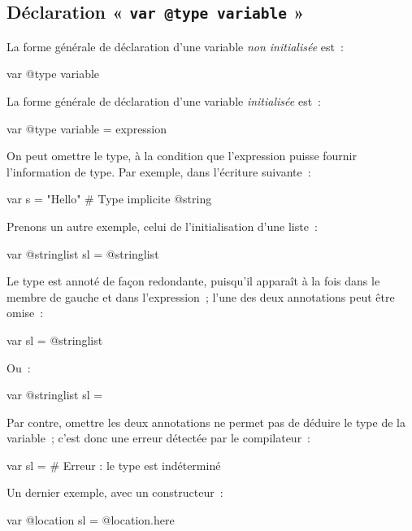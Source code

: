 \subsection{Déclaration « \texttt{var @type variable} »}

La forme générale de déclaration d'une variable \emph{non initialisée} est~:
\begin{galgasbox}
var @type variable
\end{galgasbox}





La forme générale de déclaration d'une variable \emph{initialisée} est~:
\begin{galgasbox}
var @type variable = expression
\end{galgasbox}

On peut omettre le type, à la condition que l'expression puisse fournir l'information de type. Par exemple, dans l'écriture suivante~:
\begin{galgas}
var s = "Hello" # Type implicite @string
\end{galgas}


Prenons un autre exemple, celui de l'initialisation d'une liste~:
\begin{galgas}
var @stringlist sl = @stringlist {}
\end{galgas}

Le type est annoté de façon redondante, puisqu'il apparaît à la fois dans le membre de gauche et dans l'expression~; l'une des deux annotations peut être omise~:
\begin{galgas}
var sl = @stringlist {}
\end{galgas}

Ou~:
\begin{galgas}
var @stringlist sl = {}
\end{galgas}

Par contre, omettre les deux annotations ne permet pas de déduire le type de la variable~; c'est donc une erreur détectée par le compilateur~:
\begin{galgas}
var sl = {} # Erreur : le type est indéterminé
\end{galgas}

Un dernier exemple, avec un constructeur~:
\begin{galgas}
var @location sl = @location.here
\end{galgas}

